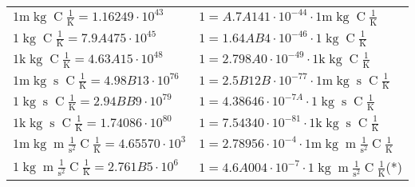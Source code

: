 \begin{center}
\begin{longtable}{l l}
{\color{gray}$1 \bm{\mathrm{ m}}\operatorname{kg}{}{}{\operatorname{C}}\frac1{\operatorname{K}} = 1.16249\cdot10^{43} $}   & {\color{gray}$ 1 = A.7A141\cdot10^{-44} \cdot 1 \bm{\mathrm{ m}}\operatorname{kg}{}{}{\operatorname{C}}\frac1{\operatorname{K}}$}  \\
{\color{black}$1 \bm{\mathrm{ }}\operatorname{kg}{}{}{\operatorname{C}}\frac1{\operatorname{K}} = 7.9A475\cdot10^{45} $}   & {\color{black}$ 1 = 1.64AB4\cdot10^{-46} \cdot 1 \bm{\mathrm{ }}\operatorname{kg}{}{}{\operatorname{C}}\frac1{\operatorname{K}}$}  \\
{\color{gray}$1 \bm{\mathrm{ k}}\operatorname{kg}{}{}{\operatorname{C}}\frac1{\operatorname{K}} = 4.63A15\cdot10^{48} $}   & {\color{gray}$ 1 = 2.798A0\cdot10^{-49} \cdot 1 \bm{\mathrm{ k}}\operatorname{kg}{}{}{\operatorname{C}}\frac1{\operatorname{K}}$}  \\
{\color{gray}$1 \bm{\mathrm{ m}}\operatorname{kg}{}{\operatorname{s}}{\operatorname{C}}\frac1{\operatorname{K}} = 4.98B13\cdot10^{76} $}   & {\color{gray}$ 1 = 2.5B12B\cdot10^{-77} \cdot 1 \bm{\mathrm{ m}}\operatorname{kg}{}{\operatorname{s}}{\operatorname{C}}\frac1{\operatorname{K}}$}  \\
{\color{black}$1 \bm{\mathrm{ }}\operatorname{kg}{}{\operatorname{s}}{\operatorname{C}}\frac1{\operatorname{K}} = 2.94BB9\cdot10^{79} $}   & {\color{black}$ 1 = 4.38646\cdot10^{-7A} \cdot 1 \bm{\mathrm{ }}\operatorname{kg}{}{\operatorname{s}}{\operatorname{C}}\frac1{\operatorname{K}}$}  \\
{\color{gray}$1 \bm{\mathrm{ k}}\operatorname{kg}{}{\operatorname{s}}{\operatorname{C}}\frac1{\operatorname{K}} = 1.74086\cdot10^{80} $}   & {\color{gray}$ 1 = 7.54340\cdot10^{-81} \cdot 1 \bm{\mathrm{ k}}\operatorname{kg}{}{\operatorname{s}}{\operatorname{C}}\frac1{\operatorname{K}}$}  \\
{\color{gray}$1 \bm{\mathrm{ m}}\operatorname{kg}{\operatorname{m}}\frac1{\operatorname{s}^2}{\operatorname{C}}\frac1{\operatorname{K}} = 4.65570\cdot10^{3} $}   & {\color{gray}$ 1 = 2.78956\cdot10^{-4} \cdot 1 \bm{\mathrm{ m}}\operatorname{kg}{\operatorname{m}}\frac1{\operatorname{s}^2}{\operatorname{C}}\frac1{\operatorname{K}}$}  \\
{\color{black}$1 \bm{\mathrm{ }}\operatorname{kg}{\operatorname{m}}\frac1{\operatorname{s}^2}{\operatorname{C}}\frac1{\operatorname{K}} = 2.761B5\cdot10^{6} $}   & {\color{black}$ 1 = 4.6A004\cdot10^{-7} \cdot 1 \bm{\mathrm{ }}\operatorname{kg}{\operatorname{m}}\frac1{\operatorname{s}^2}{\operatorname{C}}\frac1{\operatorname{K}}$}\quad(*)\\

\end{longtable}
\end{center}

